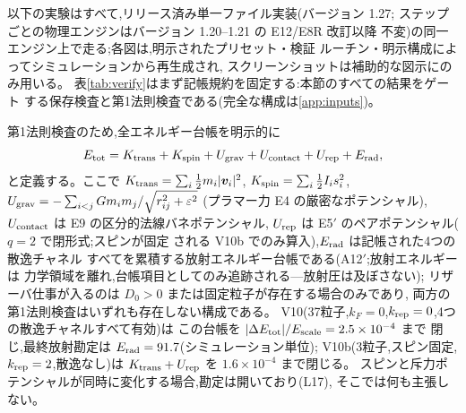 \documentclass[a4paper,10pt,twocolumn]{ltjsarticle}
\newcommand{\vect}[1]{\bm{#1}}
\newcommand{\Dz}{D_0}
\begin{document}
以下の実験はすべて,リリース済み単一ファイル実装(バージョン 1.27;
ステップごとの物理エンジンはバージョン 1.20--1.21 の E12/E8R 改訂以降
不変)の同一エンジン上で走る;各図は,明示されたプリセット・検証
ルーチン・明示構成によってシミュレーションから再生成され,
スクリーンショットは補助的な図示にのみ用いる。
表\ref{tab:verify}はまず記帳規約を固定する:本節のすべての結果をゲート
する保存検査と第1法則検査である(完全な構成は\ref{app:inputs})。

第1法則検査のため,全エネルギー台帳を明示的に
\begin{equation}
E_{\rm tot} = K_{\rm trans} + K_{\rm spin} + U_{\rm grav}
 + U_{\rm contact} + U_{\rm rep} + E_{\rm rad},
\label{eq:etot}
\end{equation}
と定義する。ここで $K_{\rm trans} = \sum_i \tfrac12 m_i|\vect{v}_i|^2$,
$K_{\rm spin} = \sum_i \tfrac12 I_i s_i^2$,
$U_{\rm grav} = -\sum_{i<j} G m_i m_j/\sqrt{r_{ij}^2+\varepsilon^2}$
(プラマー力 E4 の厳密なポテンシャル),
$U_{\rm contact}$ は E9 の区分的法線バネポテンシャル,
$U_{\rm rep}$ は E5$'$ のペアポテンシャル($q=2$ で閉形式;スピンが固定
される V10b でのみ算入),$E_{\rm rad}$ は記帳された4つの散逸チャネル
すべてを累積する放射エネルギー台帳である(A12$'$;放射エネルギーは
力学領域を離れ,台帳項目としてのみ追跡される---放射圧は及ぼさない);
リザーバ仕事が入るのは $\Dz>0$ または固定粒子が存在する場合のみであり,
両方の第1法則検査はいずれも存在しない構成である。
V10(37粒子,$k_F = 0$,$k_{\rm rep}=0$,4つの散逸チャネルすべて有効)は
この台帳を $|\Delta E_{\rm tot}|/E_{\rm scale} = 2.5\times10^{-4}$ まで
閉じ,最終放射勘定は $E_{\rm rad} = 91.7$(シミュレーション単位);
V10b(3粒子,スピン固定,$k_{\rm rep}=2$,散逸なし)は
$K_{\rm trans}+U_{\rm rep}$ を $1.6\times10^{-4}$ まで閉じる。
スピンと斥力ポテンシャルが同時に変化する場合,勘定は開いており(L17),
そこでは何も主張しない。
\end{document}
